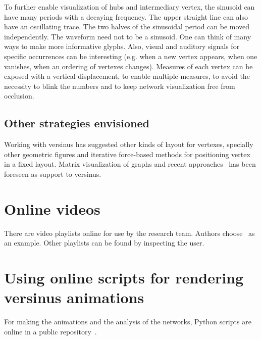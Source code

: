 \documentclass[%
 aip,
 jmp,%
 amsmath,amssymb,
 reprint,%
]{revtex4-1}
\begin{document}
To further enable visualization of hubs and intermediary vertex,
the sinusoid can have many periods 
with a decaying frequency.
The upper straight line can also have an oscillating trace.
The two halves of the sinusoidal period can be moved independently.
The waveform need not to be a sinusoid.
One can think of many ways to make more informative glyphs. Also, visual and auditory signals for specific occurrences can be interesting (e.g. when a new vertex appears, when one vanishes, when an ordering of vertexes changes).
Measures of each vertex can be exposed with a vertical displacement, to enable multiple measures, to avoid the necessity to blink the numbers and to keep network visualization free from occlusion.

\subsection{Other strategies envisioned}\label{sec:other}
Working with versinus has suggested other kinds of layout for vertexes, specially other geometric figures and iterative force-based methods for positioning vertex in a fixed layout. Matrix visualization of graphs and recent approaches~\cite{Viz1} has been foreseen as support to versinus.

\appendix

\section{Online videos}
There are video playlists online for use by the research team. Authors
choose~\cite{animacoes} as an example. Other playlists can be found by inspecting the user.

\section{Using online scripts for rendering versinus animations}
For making the animations and the analysis of the networks, Python scripts are online in a public repository~\cite{scriptsFim}.

\vspace{5mm}
\nocite{*}
\end{document}
